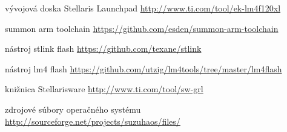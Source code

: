 \begin{thebibliography}{99}
vývojová doska Stellaris Launchpad
\url{http://www.ti.com/tool/ek-lm4f120xl}




summon arm toolchain
\url{https://github.com/esden/summon-arm-toolchain}

nástroj stlink flash
\url{https://github.com/texane/stlink}

nástroj lm4 flash
\url{https://github.com/utzig/lm4tools/tree/master/lm4flash}

knižnica Stellarisware
\url{http://www.ti.com/tool/sw-grl}

zdrojové súbory operačného systému
\url{http://sourceforge.net/projects/suzuhaos/files/}


\end{thebibliography}
